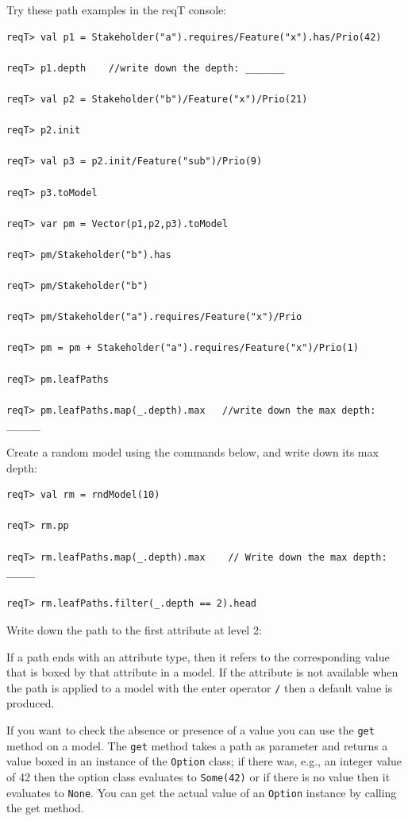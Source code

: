 \documentclass[11pt]{article}
\begin{document}
\begin{framed}\noindent
Try these path examples in the reqT console: 
{\scriptsize \begin{verbatim}
reqT> val p1 = Stakeholder("a").requires/Feature("x").has/Prio(42)

reqT> p1.depth    //write down the depth: _______

reqT> val p2 = Stakeholder("b")/Feature("x")/Prio(21)

reqT> p2.init

reqT> val p3 = p2.init/Feature("sub")/Prio(9)

reqT> p3.toModel

reqT> var pm = Vector(p1,p2,p3).toModel

reqT> pm/Stakeholder("b").has

reqT> pm/Stakeholder("b")

reqT> pm/Stakeholder("a").requires/Feature("x")/Prio

reqT> pm = pm + Stakeholder("a").requires/Feature("x")/Prio(1)

reqT> pm.leafPaths

reqT> pm.leafPaths.map(_.depth).max   //write down the max depth: ______
\end{verbatim}}
\end{framed}
\begin{framed}\noindent
Create a random model using the commands below, and write down its max depth: \underline{\hspace{1cm}}
{\scriptsize \begin{verbatim}
reqT> val rm = rndModel(10)
 
reqT> rm.pp

reqT> rm.leafPaths.map(_.depth).max    // Write down the max depth: _____

reqT> rm.leafPaths.filter(_.depth == 2).head
\end{verbatim}}
\noindent Write down the path to the first attribute at level 2:\newline\newline
\underline{\hspace{11cm}}
\end{framed}
 
If a path ends with an attribute type, then it refers to the corresponding value that is boxed by that attribute in a model. If the attribute is not available when the path is applied to a model with the enter operator \verb+/+ then a default value is produced. 

If you want to check the absence or presence of a value you can use the \verb+get+ method on a model. The \verb+get+ method takes a path as parameter and returns a value boxed in an instance of the \verb+Option+ class; if there was, e.g.,  an integer value of 42 then the option class evaluates to \verb+Some(42)+ or if there is no value then it evaluates to \verb+None+. You can get the actual value of an \verb+Option+ instance by calling the get method.    
\end{document}
